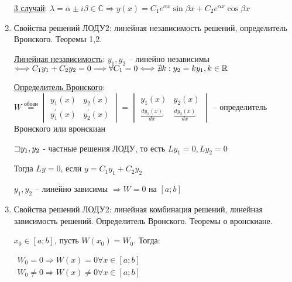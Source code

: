 \documentclass[12pt]{article}
\begin{document}
\begin{enumerate}
        \hyperlink{ldesgcomplexsolutions}{3 случай}: $\lambda = \alpha \pm i \beta \in \mathbb{C} \Longrightarrow y(x) = C_1 e^{\alpha x} \sin \beta x + C_2 e^{\alpha x} \cos \beta x$


        \item Свойства решений ЛОДУ2: линейная независимость решений, определитель Вронского. Теоремы 1,2.

        \hyperlink{linearindependance}{Линейная независимость}: \Defs $y_1, y_2$ -- линейно независимы $\Longleftrightarrow C_1 y_1 + C_2 y_2 = 0 \Longrightarrow \forall C_1 = 0 \Longleftrightarrow \nexists k : y_2 = k y_1, k \in \mathbb{R}$
        
        \hyperlink{determinantWronski}{Определитель Вронского}: \Defs $W \stackrel{\text{обозн}}{=} \begin{vmatrix}y_1(x) & y_2(x) \\ y_1^\prime(x) & y_2^\prime(x)\end{vmatrix} = \begin{vmatrix}y_1(x) & y_2(x) \\ \frac{d y_1(x)}{dx} & \frac{d y_2(x)}{dx}\end{vmatrix}$ -- определитель Вронского или вронскиан

        \begin{MyTheorem}
             $\mathord{\sqsupset} y_1, y_2$ - частные решения ЛОДУ, то есть $Ly_1 = 0, Ly_2 = 0$

            Тогда $Ly = 0$, если $y = C_1 y_1 + C_2 y_2$
        \end{MyTheorem}

        \begin{MyTheorem}
             $y_1, y_2$ -- линейно зависимы $\Longrightarrow W = 0$ на $[a;b]$
        \end{MyTheorem}    

        \item Свойства решений ЛОДУ2: линейная комбинация решений, линейная зависимость решений. Определитель Вронского. Теоремы о вронскиане.

        \begin{MyTheorem}
             $x_0 \in [a;b]$, пусть $W(x_0) = W_0$. Тогда: 
            
            $\begin{matrix}W_0 = 0 \Longrightarrow W(x) = 0 \forall x \in [a;b] \\
            W_0 \neq 0 \Longrightarrow W(x) \neq 0 \forall x \in [a;b]\end{matrix}$
        \end{MyTheorem}


\end{enumerate}
\end{document}
